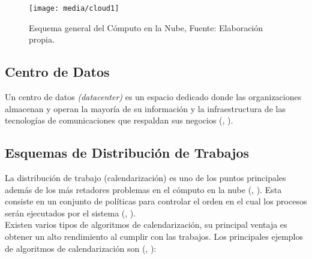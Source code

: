 \newpage

\setcounter{figure}{1}
\renewcommand\thefigure{\arabic{figure}}
\begin{figure}
	\centering
	\texttt{[image: media/cloud1]}
	\caption{Esquema general del C\'omputo en la Nube, Fuente: Elaboraci\'on propia.}
\end{figure}


\subsection*{Centro de Datos}
Un centro de datos \textit{(datacenter)} es un espacio dedicado donde las organizaciones almacenan y operan la mayor\'ia de su informaci\'on y la infraestructura de las tecnolog\'ias de comunicaciones que respaldan sus negocios (\citeauthor{whatisdatacenter}, \citeyear{whatisdatacenter}).

\subsection*{Esquemas de Distribuci\'on de Trabajos}

La distribuci\'on de trabajo (calendarizaci\'on) es uno de los puntos principales adem\'as de los m\'as retadores problemas en el c\'omputo en la nube (\citeauthor{li2014greedy}, \citeyear{li2014greedy}). Esta consiste en un conjunto de pol\'iticas para controlar el orden en el cual los procesos ser\'an ejecutados por el sistema (\citeauthor{agarwal2014efficient}, \citeyear{agarwal2014efficient}).\\

Existen varios tipos de algoritmos de calendarizaci\'on, su principal ventaja es obtener un alto rendimiento al cumplir con las trabajos. Los principales ejemplos de algoritmos de calendarizaci\'on son (\citeauthor{salot2013survey}, \citeyear{salot2013survey}):

